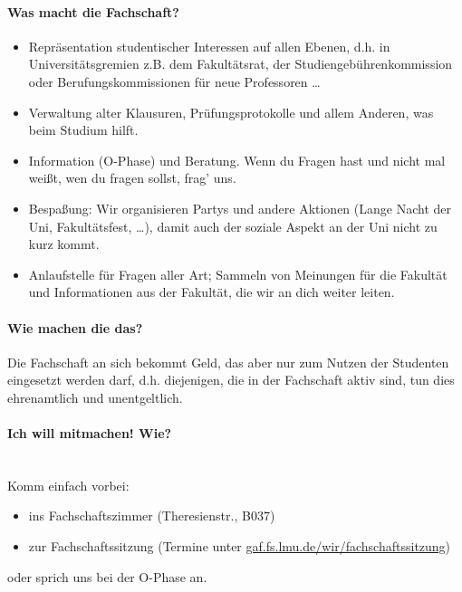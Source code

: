 \paragraph{Was macht die Fachschaft?}
\begin{itemize}
\item Repräsentation studentischer Interessen auf allen Ebenen, d.h. in Universitätsgremien z.B. dem Fakultätsrat, der Studiengebührenkommission oder Berufungskommissionen für neue Professoren \ldots
\item Verwaltung alter Klausuren, Prüfungsprotokolle und allem Anderen, was beim Studium hilft.
\item Information (O-Phase) und Beratung. Wenn du Fragen hast und nicht mal weißt, wen du fragen sollst, frag' uns.
\item Bespaßung: Wir organisieren Partys und andere Aktionen (Lange Nacht der Uni, Fakultätsfest, \ldots), damit auch der soziale Aspekt an der Uni nicht zu kurz kommt.
\item Anlaufstelle für Fragen aller Art; Sammeln von Meinungen für die Fakultät und Informationen aus der Fakultät, die wir an dich weiter leiten.
\end{itemize}

\paragraph{Wie machen die das?}
Die Fachschaft an sich bekommt Geld, das aber nur zum Nutzen der
Studenten eingesetzt werden darf, d.h. diejenigen, die in der
Fachschaft aktiv sind, tun dies ehrenamtlich und unentgeltlich.

\clearpage

\paragraph{Ich will mitmachen! Wie?}\label{mitmachen}\hfill\\

Komm einfach vorbei:
\begin{itemize}
	\item ins Fachschaftszimmer (Theresienstr., B037)
	\item zur Fachschaftssitzung (Termine unter \url{gaf.fs.lmu.de/wir/fachschaftssitzung})
\end{itemize}
oder sprich uns bei der O-Phase an.


